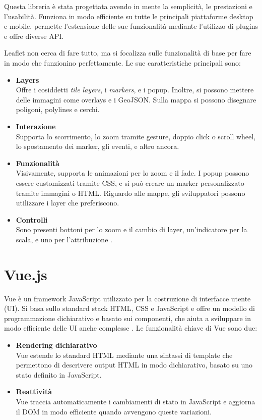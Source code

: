 Questa libreria è stata progettata avendo in mente la semplicità, le prestazioni e l'usabilità. Funziona in modo efficiente su tutte le principali piattaforme desktop e mobile, permette l'estensione delle sue funzionalità mediante l'utilizzo di plugins e offre diverse API.

Leaflet non cerca di fare tutto, ma si focalizza sulle funzionalità di base per fare in modo che funzionino perfettamente. Le sue caratteristiche principali sono:
\begin{itemize}
    \item \textbf{Layers}\\
    Offre i cosiddetti \textit{tile layers}, i \textit{markers}, e i popup. Inoltre, si possono mettere delle immagini come overlays e i GeoJSON. Sulla mappa si possono disegnare poligoni, polylines e cerchi.
    \item \textbf{Interazione}\\
    Supporta lo scorrimento, lo zoom tramite gesture, doppio click o scroll wheel, lo spostamento dei marker, gli eventi, e altro ancora.
    \item \textbf{Funzionalità}\\
    Visivamente, supporta le animazioni per lo zoom e il fade. I popup possono essere customizzati tramite CSS, e si può creare un marker personalizzato tramite immagini o HTML. Riguardo alle mappe, gli sviluppatori possono utilizzare i layer che preferiscono.
    \item \textbf{Controlli}\\
    Sono presenti bottoni per lo zoom e il cambio di layer, un'indicatore per la scala, e uno per l'attribuzione \cite{Leaflet_Overview}.
\end{itemize}

\section{Vue.js}
Vue è un framework JavaScript utilizzato per la costruzione di interfacce utente (UI). Si basa sullo standard stack HTML, CSS e JavaScript e offre un modello di programmazione dichiarativo e basato sui componenti, che aiuta a sviluppare in modo efficiente delle UI anche complesse \cite{Vue}. Le funzionalità chiave di Vue sono due:
\begin{itemize}
    \item \textbf{Rendering dichiarativo}\\
    Vue estende lo standard HTML mediante una sintassi di template che permettono di descrivere output HTML in modo dichiarativo, basato su uno stato definito in JavaScript.
    \item \textbf{Reattività}\\
    Vue traccia automaticamente i cambiamenti di stato in JavaScript e aggiorna il DOM in modo efficiente quando avvengono queste variazioni.
\end{itemize}

